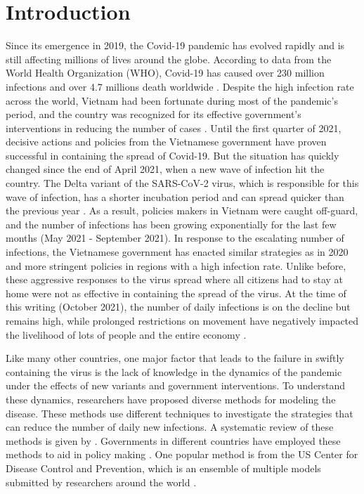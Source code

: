 \chapter{Introduction}


Since its emergence in 2019, the Covid-19 pandemic has evolved rapidly and is still affecting millions of lives around the globe.
According to data from the World Health Organization (WHO), Covid-19 has caused over 230 million infections and over 4.7 millions death worldwide \cite{WHOCoronavirusCOVID19}.
Despite the high infection rate across the world, Vietnam had been fortunate during most of the pandemic's period, and the country was recognized for its effective government's interventions in reducing the number of cases \cite{EmergingCOVID19Success,haCombatingCOVID19Epidemic2020}.
Until the first quarter of 2021, decisive actions and policies from the Vietnamese government have proven successful in containing the spread of Covid-19.
But the situation has quickly changed since the end of April 2021, when a new wave of infection hit the country.
The Delta variant of the SARS-CoV-2 virus, which is responsible for this wave of infection, has a shorter incubation period and can spread quicker than the previous year \cite{VietnamNewCOVID,mahaseDeltaVariantWhat2021}.
As a result, policies makers in Vietnam were caught off-guard, and the number of infections has been growing exponentially for the last few months (May 2021 - September 2021).
In response to the escalating number of infections, the Vietnamese government has enacted similar strategies as in 2020 and more stringent policies in regions with a high infection rate.
Unlike before, these aggressive responses to the virus spread where all citizens had to stay at home were not as effective in containing the spread of the virus.
At the time of this writing (October 2021), the number of daily infections is on the decline but remains high, while prolonged restrictions on movement have negatively impacted the livelihood of lots of people and the entire economy \cite{RapidAssessmentDesign, VietnamPoisedMiss}.

Like many other countries, one major factor that leads to the failure in swiftly containing the virus is the lack of knowledge in the dynamics of the pandemic under the effects of new variants and government interventions.
To understand these dynamics, researchers have proposed diverse methods for modeling the disease.
These methods use different techniques to investigate the strategies that can reduce the number of daily new infections.
A systematic review of these methods is given by \citeauthor{rahimiReviewCOVID19Forecasting2021} \cite{rahimiReviewCOVID19Forecasting2021}.
Governments in different countries have employed these methods to aid in policy making \cite{adamSpecialReportSimulations2020}.
One popular method is from the \gls{US} Center for Disease Control and Prevention, which is an ensemble of multiple models submitted by researchers around the world \cite{rayEnsembleForecastsCoronavirus2020}.

